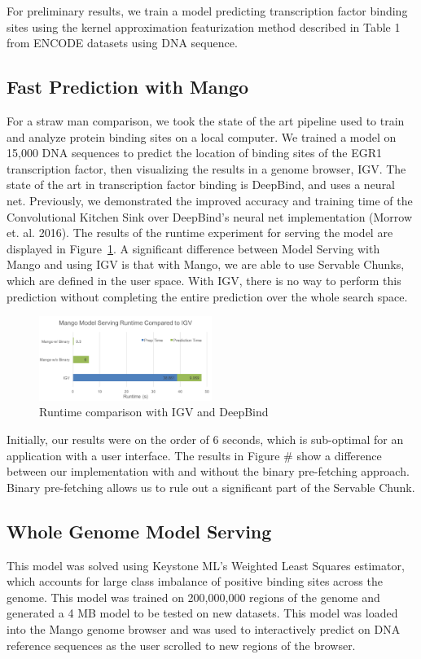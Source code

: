 \documentclass{sig-alternate-05-2015}
\begin{document}
For preliminary results, we train a model predicting transcription factor binding sites using the kernel approximation featurization method described in Table 1 from ENCODE datasets using DNA sequence.


\subsection{Fast Prediction with Mango}
For a straw man comparison, we took the state of the art pipeline used to train and analyze protein binding sites on a local computer. We trained a model on 15,000 DNA sequences to predict the location of binding sites of the EGR1 transcription factor, then visualizing the results in a genome browser, IGV. The state of the art in transcription factor binding is DeepBind, and uses a neural net. Previously, we demonstrated the improved accuracy and training time of the Convolutional Kitchen Sink over DeepBind's neural net implementation (Morrow et. al. 2016). The results of the runtime experiment for serving the model are displayed in Figure~\ref{fig:igvcomp}. A significant difference between Model Serving with Mango and using IGV is that with Mango, we are able to use Servable Chunks, which are defined in the user space. With IGV, there is no way to perform this prediction without completing the entire prediction over the whole search space.

\begin{figure}
  \label{fig:igvcomp}
  \includegraphics[width=0.5\textwidth]{figures/mangoVsIGV.png}
  \caption{Runtime comparison with IGV and DeepBind}
\end{figure}

Initially, our results were on the order of 6 seconds, which is sub-optimal for an application with a user interface. The results in Figure \# show a difference between our implementation with and without the binary pre-fetching approach. Binary pre-fetching allows us to rule out a significant part of the Servable Chunk. 

\subsection{Whole Genome Model Serving}
This model was solved using Keystone ML's Weighted Least Squares estimator, which accounts for large class imbalance of positive binding sites across the genome. This model was trained on 200,000,000 regions of the genome and generated a 4 MB model to be tested on new datasets. This model was loaded into the Mango genome browser and was used to interactively predict on DNA reference sequences as the user scrolled to new regions of the browser.
\end{document}
